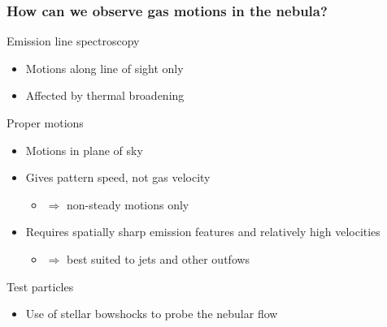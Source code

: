 \documentclass[presentation, draft]{beamer}
\begin{document}
\begin{frame}
  \frametitle{How can we observe gas motions in the nebula?}
  \begin{block}{Emission line spectroscopy}
    \begin{itemize}
    \item Motions along line of sight only
    \item Affected by thermal broadening
    \end{itemize}
  \end{block}

  \begin{block}{Proper motions}
    \begin{itemize}
    \item Motions in plane of sky
    \item Gives pattern speed, not gas velocity
      \begin{itemize}
      \item \(\Rightarrow\) non-steady motions only
      \end{itemize}
    \item Requires spatially sharp emission features and relatively high velocities
      \begin{itemize}
      \item \(\Rightarrow\) best suited to jets and other outfows
      \end{itemize}
    \end{itemize}
  \end{block}
  
  \begin{block}{Test particles}
    \begin{itemize}
    \item Use of stellar bowshocks to probe the nebular flow
    \end{itemize}
  \end{block}

  \end{frame}
\end{document}

